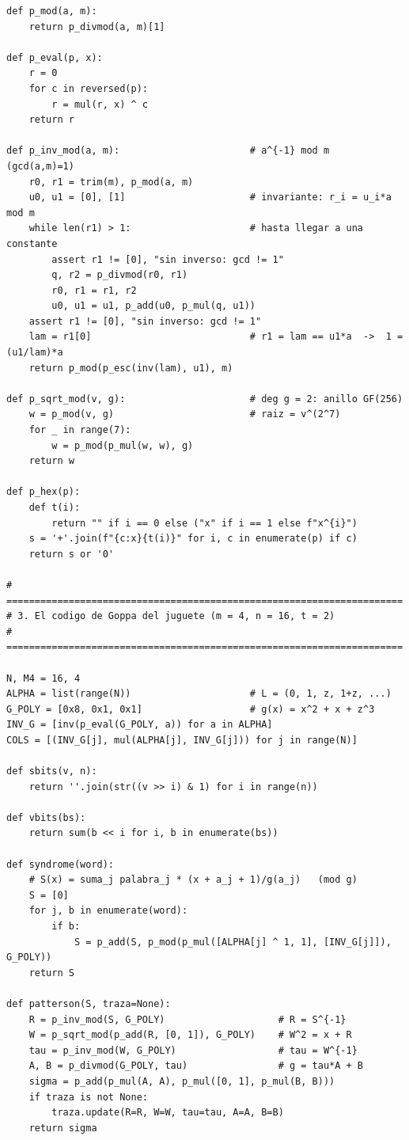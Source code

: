 \documentclass[11pt,a4paper,oneside]{report}
\begin{document}
\begin{lstlisting}
def p_mod(a, m):
    return p_divmod(a, m)[1]

def p_eval(p, x):
    r = 0
    for c in reversed(p):
        r = mul(r, x) ^ c
    return r

def p_inv_mod(a, m):                       # a^{-1} mod m  (gcd(a,m)=1)
    r0, r1 = trim(m), p_mod(a, m)
    u0, u1 = [0], [1]                      # invariante: r_i = u_i*a mod m
    while len(r1) > 1:                     # hasta llegar a una constante
        assert r1 != [0], "sin inverso: gcd != 1"
        q, r2 = p_divmod(r0, r1)
        r0, r1 = r1, r2
        u0, u1 = u1, p_add(u0, p_mul(q, u1))
    assert r1 != [0], "sin inverso: gcd != 1"
    lam = r1[0]                            # r1 = lam == u1*a  ->  1 = (u1/lam)*a
    return p_mod(p_esc(inv(lam), u1), m)

def p_sqrt_mod(v, g):                      # deg g = 2: anillo GF(256)
    w = p_mod(v, g)                        # raiz = v^(2^7)
    for _ in range(7):
        w = p_mod(p_mul(w, w), g)
    return w

def p_hex(p):
    def t(i):
        return "" if i == 0 else ("x" if i == 1 else f"x^{i}")
    s = '+'.join(f"{c:x}{t(i)}" for i, c in enumerate(p) if c)
    return s or '0'

# ======================================================================
# 3. El codigo de Goppa del juguete (m = 4, n = 16, t = 2)
# ======================================================================

N, M4 = 16, 4
ALPHA = list(range(N))                     # L = (0, 1, z, 1+z, ...)
G_POLY = [0x8, 0x1, 0x1]                   # g(x) = x^2 + x + z^3
INV_G = [inv(p_eval(G_POLY, a)) for a in ALPHA]
COLS = [(INV_G[j], mul(ALPHA[j], INV_G[j])) for j in range(N)]

def sbits(v, n):
    return ''.join(str((v >> i) & 1) for i in range(n))

def vbits(bs):
    return sum(b << i for i, b in enumerate(bs))

def syndrome(word):
    # S(x) = suma_j palabra_j * (x + a_j + 1)/g(a_j)   (mod g)
    S = [0]
    for j, b in enumerate(word):
        if b:
            S = p_add(S, p_mod(p_mul([ALPHA[j] ^ 1, 1], [INV_G[j]]), G_POLY))
    return S

def patterson(S, traza=None):
    R = p_inv_mod(S, G_POLY)                    # R = S^{-1}
    W = p_sqrt_mod(p_add(R, [0, 1]), G_POLY)    # W^2 = x + R
    tau = p_inv_mod(W, G_POLY)                  # tau = W^{-1}
    A, B = p_divmod(G_POLY, tau)                # g = tau*A + B
    sigma = p_add(p_mul(A, A), p_mul([0, 1], p_mul(B, B)))
    if traza is not None:
        traza.update(R=R, W=W, tau=tau, A=A, B=B)
    return sigma


\end{lstlisting}
\end{document}
